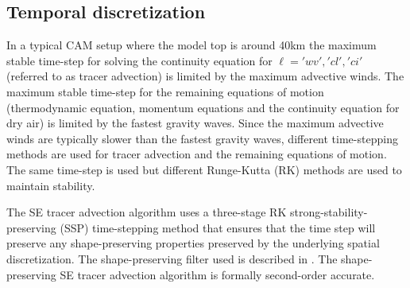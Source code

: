 \documentclass{agujournal}
\begin{document}

\subsection{Temporal discretization}
In a typical CAM setup where the model top is around 40km the maximum stable time-step for solving the continuity equation for $\ell='wv','cl','ci'$ (referred to as tracer advection) is limited by the maximum advective winds. The maximum stable time-step for the remaining equations of motion (thermodynamic equation, momentum equations and the continuity equation for dry air) is limited by the fastest gravity waves.  Since the maximum advective winds are typically slower than the fastest gravity waves, different time-stepping methods are used for tracer advection and the remaining equations of motion. The same time-step is used but different Runge-Kutta (RK) methods are used to maintain stability. 

The SE tracer advection algorithm uses a three-stage RK strong-stability-preserving (SSP) time-stepping method that ensures that the time step will preserve any shape-preserving properties preserved by the underlying spatial discretization\citep{SR2002SIAM}. The shape-preserving filter used is described in \citet{GTS2014JCP}. The shape-preserving SE tracer advection algorithm is formally second-order accurate.{\color{red}{[limiter applied in last RK step?]}}
\end{document}

